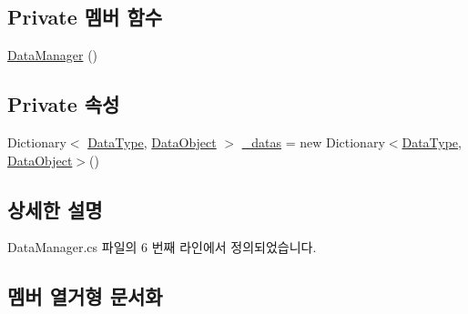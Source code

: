 \subsection*{Private 멤버 함수}
\begin{DoxyCompactItemize}
\item 
\hyperlink{class_data_manager_a35770e76737b1bdbcfdab3d2e5d652e4}{Data\+Manager} ()
\end{DoxyCompactItemize}
\subsection*{Private 속성}
\begin{DoxyCompactItemize}
\item 
Dictionary$<$ \hyperlink{class_data_manager_ac9cb5bf021d3ebcc7f3eaa4bf5393408}{Data\+Type}, \hyperlink{class_data_object}{Data\+Object} $>$ \hyperlink{class_data_manager_a01ff3ff6f614ac0840d1209110710666}{\+\_\+datas} = new Dictionary$<$\hyperlink{class_data_manager_ac9cb5bf021d3ebcc7f3eaa4bf5393408}{Data\+Type}, \hyperlink{class_data_object}{Data\+Object}$>$()
\end{DoxyCompactItemize}


\subsection{상세한 설명}


Data\+Manager.\+cs 파일의 6 번째 라인에서 정의되었습니다.



\subsection{멤버 열거형 문서화}
